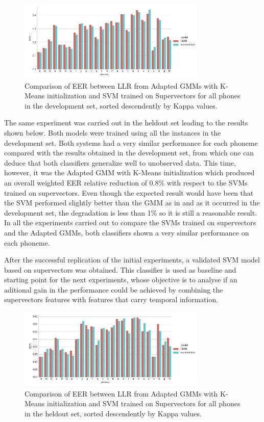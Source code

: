 \begin{figure}[H]
	\centering
	\includegraphics[width=0.8\textwidth]{files/figures/results/gmm-vs-supervectors/gmm-vs-supervectors-dev.png}
	\caption{Comparison of EER between LLR from Adapted GMMs with K-Means initialization
	and SVM trained on Supervectors for all phones in the development set, sorted
	descendently by Kappa values.}
	\label{fig:gmmSupervectorsDev}
\end{figure}

The same experiment was carried out in the heldout set leading to the results shown below.
Both models were trained using all the instances in the development set.
Both systems had a very similar performance for each phoneme compared with the results obtained
in the development set, from which one can deduce that both classifiers generalize well to
unobserved data. This time, however, it was the Adapted GMM with K-Means initialization
which produced an overall weighted EER relative reduction of 0.8\% with respect to the SVMs
trained on supervectors. Even though the expected result would have been that the SVM performed
slightly better than the GMM as in \cite{main} and as it occurred in the development set,
the degradation is less than 1\% so it is still a reasonable result. In all the experiments
carried out to compare the SVMs trained on supervectors and the Adapted GMMs, both classifiers
shown a very similar performance on each phoneme.

After the successful replication of the initial experiments, a validated SVM model based on
supervectors was obtained. This classifier is used as baseline and starting point for
the next experiments,
whose objective is to analyse if an aditional gain in the performance could be achieved by
combining the supervectors features with features that carry temporal information.

\begin{figure}[H]
	\centering
	\includegraphics[width=0.8\textwidth]{files/figures/results/gmm-vs-supervectors/gmm-vs-supervectors-heldout.png}
	\caption{Comparison of EER between LLR from Adapted GMMs with K-Means initialization
	and SVM trained on Supervectors for all phones in the heldout set, sorted descendently
	by Kappa values.}
	\label{fig:gmmSupervectorsTest}
\end{figure}

